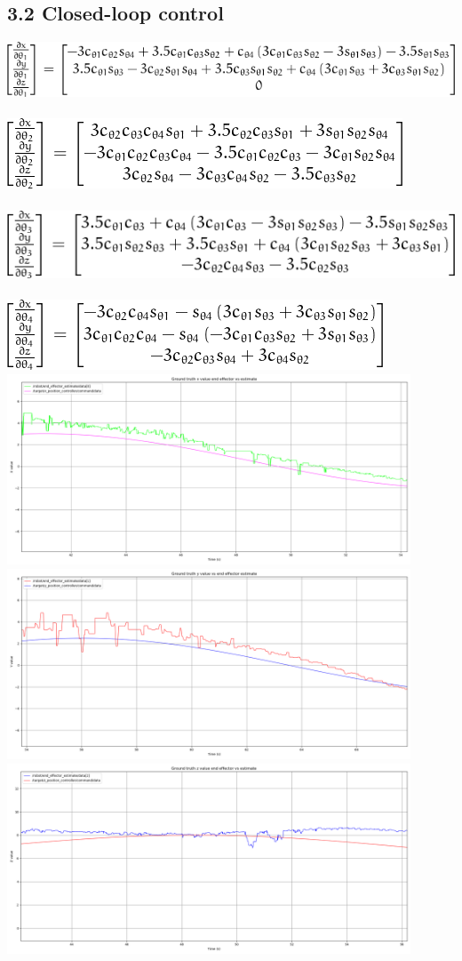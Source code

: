 \subsection{3.2 Closed-loop control}
\includegraphics[]{jac_col1.png} \\ \\
\includegraphics[]{jac_col2.png} \\ \\
\includegraphics[]{jac_col3.png} \\ \\
\includegraphics[]{jac_col4.png} \\
\includegraphics[width=0.9\textwidth]{plots/closed_x.png} \\
\includegraphics[width=0.9\textwidth]{plots/closed_y.png} \\
\includegraphics[width=0.9\textwidth]{plots/closed_z.png}
